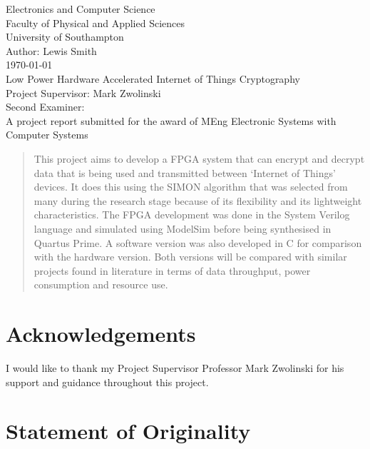 \documentclass[12pt,twoside,a4paper]{report}
\begin{document}
    
	\begin{titlepage}
	\begin{center}
		\Huge
		Electronics and Computer Science
		\\Faculty of Physical and Applied Sciences
		\\University of Southampton
		\Large
		\\[4cm]Author: Lewis Smith
		\\[1cm]\today
		\\[2cm]Low Power Hardware Accelerated Internet of Things Cryptography
		\\[4cm]Project Supervisor: Mark Zwolinski
		\\Second Examiner:
		\\[4cm]A project report submitted for the award of MEng Electronic Systems with Computer Systems
        
	\end{center}
	\end{titlepage}
	\thispagestyle{empty}
	\cleardoublepage
    
	\begin{abstract}
    
	This project aims to develop a FPGA system that can encrypt and decrypt data that is being used and transmitted between `Internet of Things' devices. It does this using the SIMON algorithm that was selected from many during the research stage because of its flexibility and its lightweight characteristics. The FPGA development was done in the System Verilog language and simulated using ModelSim before being synthesised in Quartus Prime. A software version was also developed in C for comparison with the hardware version. Both versions will be compared with similar projects found in literature in terms of data throughput, power consumption and resource use. 
    
	\end{abstract}
    
	\tableofcontents
	\newpage
    
	\section*{Acknowledgements}
	I would like to thank my Project Supervisor Professor Mark Zwolinski for his support and guidance throughout this project.
	
	\section*{Statement of Originality}
    
\end{document}
